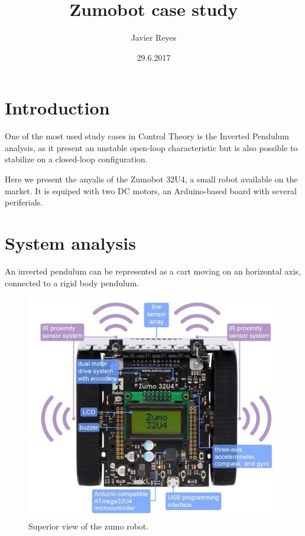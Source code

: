 \documentclass{article}
\title{Zumobot case study}
\date{29.6.2017}
\author{Javier Reyes}
\begin{document}
\maketitle
{}
\newpage
{}

\tableofcontents
\newpage

\section{Introduction}

One of the most used study cases in Control Theory is the Inverted Pendulum analysis, as it present an unstable open-loop characteristic but is also possible to stabilize on a closed-loop configuration.

Here we present the anyalis of the Zumobot 32U4, a small robot available on the market. It is equiped with two DC motors, an Arduino-based board with several periferials.

\section{System analysis}

An inverted pendulum can be represented as a cart moving on an horizontal axis, connected to a rigid body pendulum.

\begin{figure}[h!]
	\includegraphics{img/zumo-superior.png}
	\centering
	\caption{Superior view of the zumo robot.}
	\label{fig:sup-zumo}
\end{figure}
\end{document}

